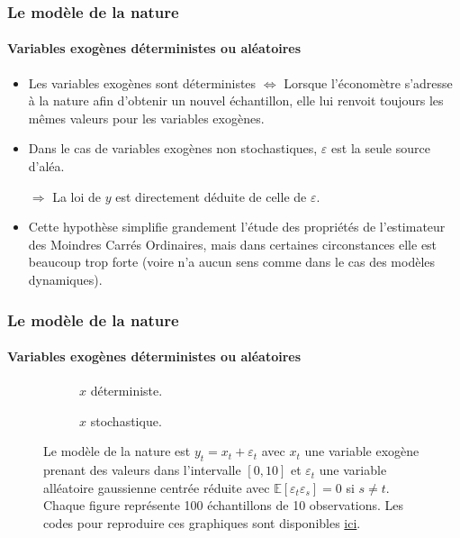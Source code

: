 \documentclass[10pt]{beamer}
\theoremstyle{plain}
\begin{document}
\begin{frame}
  \frametitle{Le modèle de la nature}
  \framesubtitle{Variables exogènes déterministes ou aléatoires}

  \begin{itemize}

  \item Les variables exogènes sont déterministes $\Leftrightarrow$
    Lorsque l'économètre s'adresse à la nature afin d'obtenir un
    nouvel échantillon, elle lui renvoit toujours les mêmes valeurs
    pour les variables exogènes.\newline

  \item Dans le cas de variables exogènes non
    stochastiques, $\varepsilon$ est la seule source d'aléa.\newline

  \item[$\Rightarrow$] La loi de $y$ est directement déduite de celle de $\varepsilon$.\newline

  \item Cette hypothèse simplifie grandement l'étude des propriétés de
    l'estimateur des Moindres Carrés Ordinaires, mais dans certaines
    circonstances elle est beaucoup trop forte (voire n'a aucun sens
    comme dans le cas des modèles dynamiques).\newline

  \end{itemize}

\end{frame}


\begin{frame}
  \frametitle{Le modèle de la nature}
  \framesubtitle{Variables exogènes déterministes ou aléatoires}

  \begin{figure}
    \centering
    \begin{subfigure}{0.4\textwidth}
      \scalebox{.3}{
    }
    \caption{$x$ déterministe.}
    \label{fig:01:a}
  \end{subfigure}
  \hfill
  \begin{subfigure}{0.4\textwidth}
    \scalebox{.3}{
    }
    \caption{$x$ stochastique.}
    \label{fig:01:b}
  \end{subfigure}
  \label{fig:01}
  \caption{Le modèle de la nature est $y_t = x_t + \varepsilon_t$ avec $x_t$ une variable exogène prenant des valeurs dans l'intervalle $[0,10]$ et $\varepsilon_t$ une variable alléatoire gaussienne centrée réduite avec $\mathbb E[\varepsilon_t\varepsilon_s]=0$ si $s\neq t$. Chaque figure représente 100 échantillons de 10 observations. Les codes pour reproduire ces graphiques sont disponibles \href{https://git.ithaca.fr/stepan/econometrics/src/commit/\HEAD/cours/codes/chapitre-1/deterministic-versus-stochastic-samples.py}{ici}.}
\end{figure}
\end{frame}
\end{document}

